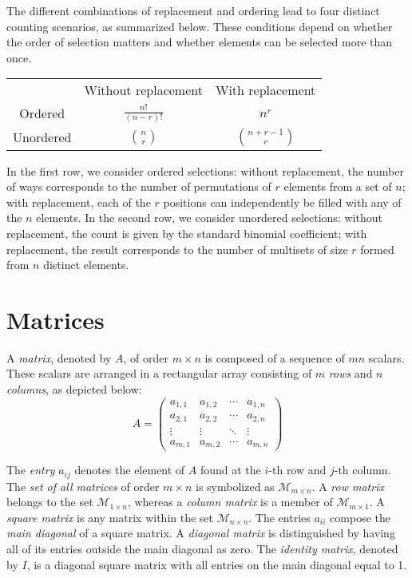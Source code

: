 The different combinations of replacement and ordering lead to four distinct counting scenarios, as summarized below. These conditions depend on whether the order of selection matters and whether elements can be selected more than once.
\begin{center}
\begin{tabular}{ c c c }
& Without replacement & With replacement \\
Ordered    & $\frac{n!}{(n-r)!}$ & $n^r$ \\
Unordered  & $\binom{n}{r}$      & $\binom{n+r-1}{r}$
\end{tabular}
\end{center}
In the first row, we consider ordered selections: without replacement, the number of ways corresponds to the number of permutations of $r$ elements from a set of $n$; with replacement, each of the $r$ positions can independently be filled with any of the $n$ elements. In the second row, we consider unordered selections: without replacement, the count is given by the standard binomial coefficient; with replacement, the result corresponds to the number of multisets of size $r$ formed from $n$ distinct elements.

%
%

\section{Matrices}

A \emph{matrix}, denoted by $A$, of order $m \times n$ is composed of a sequence of $mn$ scalars. These scalars are arranged in a rectangular array consisting of $m$ \emph{rows} and $n$ \emph{columns}, as depicted below:
\[
A = 
 \begin{pmatrix}
  a_{1,1} & a_{1,2} & \cdots & a_{1,n} \\
  a_{2,1} & a_{2,2} & \cdots & a_{2,n} \\
  \vdots  & \vdots  & \ddots & \vdots  \\
  a_{m,1} & a_{m,2} & \cdots & a_{m,n} 
 \end{pmatrix}
\]

The \emph{entry} $a_{ij}$ denotes the element of $A$ found at the $i$-th row and $j$-th column. The \emph{set of all matrices} of order $m \times n$ is symbolized as $\mathcal{M}_{m \times n}$. A \emph{row matrix} belongs to the set $\mathcal{M}_{1 \times n}$, whereas a \emph{column matrix} is a member of $\mathcal{M}_{m \times 1}$. A \emph{square matrix} is any matrix within the set $\mathcal{M}_{n \times n}$. The entries $a_{ii}$ compose the \emph{main diagonal} of a square matrix. A \emph{diagonal matrix} is distinguished by having all of its entries outside the main diagonal as zero. The \emph{identity matrix}, denoted by $I$, is a diagonal square matrix with all entries on the main diagonal equal to 1.

